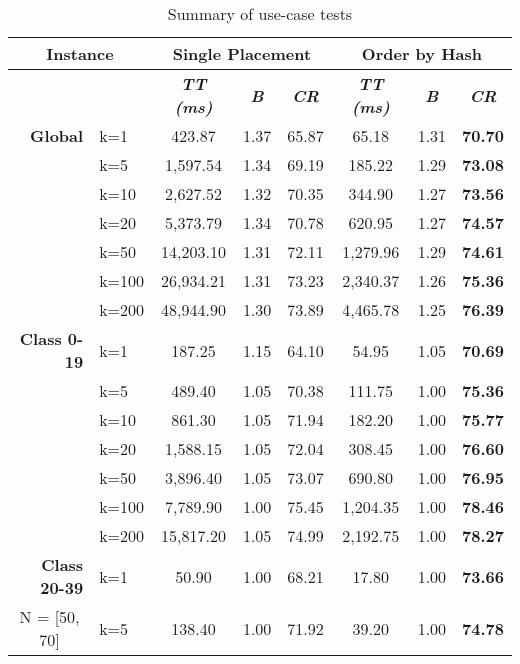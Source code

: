 \begin{table}[htbp]
    \centering
    \caption{Summary of use-case tests}
    \begin{tabular}{|l|l|c|c|c|c|c|c|}
    \hline
    \multicolumn{ 2}{|c|}{\textbf{Instance}} & \multicolumn{ 3}{c|}{\textbf{Single Placement}} & \multicolumn{ 3}{c|}{\textbf{Order by Hash}} \\ \hline
    \multicolumn{ 2}{|l|}{} & \textbf{\textit{TT (ms)}} & \textbf{\textit{B}} & \textbf{\textit{CR}} & \textbf{\textit{TT (ms)}} & \textbf{\textit{B}} & \textbf{\textit{CR}} \\ \hline
    \multicolumn{1}{|r|}{\textbf{Global}} & k=1 & 423.87 & 1.37 & 65.87 & 65.18 & 1.31 & \textbf{70.70} \\ 
     & k=5 & 1,597.54 & 1.34 & 69.19 & 185.22 & 1.29 & \textbf{73.08} \\ 
     & k=10 & 2,627.52 & 1.32 & 70.35 & 344.90 & 1.27 & \textbf{73.56} \\ 
     & k=20 & 5,373.79 & 1.34 & 70.78 & 620.95 & 1.27 & \textbf{74.57} \\ 
     & k=50 & 14,203.10 & 1.31 & 72.11 & 1,279.96 & 1.29 & \textbf{74.61} \\ 
     & k=100 & 26,934.21 & 1.31 & 73.23 & 2,340.37 & 1.26 & \textbf{75.36} \\ 
     & k=200 & 48,944.90 & 1.30 & 73.89 & 4,465.78 & 1.25 & \textbf{76.39} \\ \hline
    \multicolumn{1}{|r|}{\textbf{Class 0-19}} & k=1 & 187.25 & 1.15 & 64.10 & 54.95 & 1.05 & \textbf{70.69} \\ 
     & k=5 & 489.40 & 1.05 & 70.38 & 111.75 & 1.00 & \textbf{75.36} \\ 
     & k=10 & 861.30 & 1.05 & 71.94 & 182.20 & 1.00 & \textbf{75.77} \\ 
     & k=20 & 1,588.15 & 1.05 & 72.04 & 308.45 & 1.00 & \textbf{76.60} \\ 
     & k=50 & 3,896.40 & 1.05 & 73.07 & 690.80 & 1.00 & \textbf{76.95} \\ 
     & k=100 & 7,789.90 & 1.00 & 75.45 & 1,204.35 & 1.00 & \textbf{78.46} \\ 
     & k=200 & 15,817.20 & 1.05 & 74.99 & 2,192.75 & 1.00 & \textbf{78.27} \\ \hline
    \multicolumn{1}{|r|}{\textbf{Class 20-39}} & k=1 & 50.90 & 1.00 & 68.21 & 17.80 & 1.00 & \textbf{73.66} \\ 
    \multicolumn{1}{|c|}{N = [50, 70]} & k=5 & 138.40 & 1.00 & 71.92 & 39.20 & 1.00 & \textbf{74.78} \\ 

\end{tabular}
\end{table}
